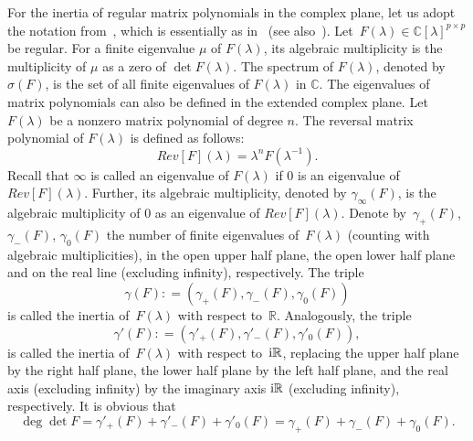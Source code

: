 \documentclass[12pt,reqno]{amsart}
\theoremstyle{plain}
\numberwithin{equation}{section}
\theoremstyle{remark}
\newcommand{\coloneqq}{\mathrel{\mathop:}=}
\newcommand{\R}{\mathbb{R}}
\begin{document}
For the inertia of regular matrix polynomials in the  complex plane, let us adopt the notation from~\cite{LRT}, which is
essentially as in~\cite{LT82} (see also~\cite[Proposition 2.2]{LRT}).
    Let~$F(\lambda)\in {\mathbb C}[\lambda]^{p\times p}$ be regular. For a finite eigenvalue $\mu$ of $F(\lambda)$,
its algebraic multiplicity is the multiplicity of $\mu$ as a zero of $\det F(\lambda)$. 
The spectrum of $F(\lambda)$, denoted by $\sigma(F)$, is the set of all finite eigenvalues of $F(\lambda)$ in $\mathbb C$. The eigenvalues of matrix polynomials can also be defined in the extended complex plane. Let $F(\lambda)$ be a nonzero matrix polynomial of degree $n$.
The reversal matrix polynomial of $F(\lambda)$ is defined as follows:
  $$
  {Rev}[F](\lambda)=\lambda^n F(\lambda^{-1}).
  $$
  Recall that $\infty$ is called an eigenvalue of $F(\lambda)$ if $0$ is an eigenvalue of ${Rev}[F](\lambda)$. Further, its algebraic multiplicity, denoted by $\gamma_{\infty}(F)$, is the algebraic multiplicity of $0$ as an eigenvalue of ${Rev}[F](\lambda)$. Denote by~$\gamma_+(F)$, $\gamma_-(F)$, $\gamma_{0}(F)$ the number of
    finite eigenvalues of~$F(\lambda)$ (counting with algebraic multiplicities), in the open upper half plane, the
    open lower half plane and on the real line (excluding infinity), respectively. The triple
\begin{equation*}
\gamma(F)\coloneqq(\gamma_+(F),\gamma_-(F),\gamma_{0}(F))
\end{equation*}
 is called 
the inertia
of~$F(\lambda)$ with respect to~$\R$.
Analogously, the triple
\begin{equation*}
\gamma'(F)\coloneqq(\gamma'_+(F),\gamma'_-(F),\gamma'_{0}(F)),
\end{equation*}
is called the inertia of~$F(\lambda)$
with respect to~${\rm i}\R$, replacing the upper half plane by the right half
plane, the lower half plane by the left half plane, and the real axis (excluding infinity)
by the imaginary axis ${\rm i}\mathbb R$ (excluding infinity), respectively.  It is obvious that 
\begin{equation*}
\deg \det F=\gamma'_+(F)+\gamma'_-(F)+\gamma'_{0}(F)=\gamma_+(F)+\gamma_-(F)+\gamma_{0}(F).
\end{equation*}
\end{document}
